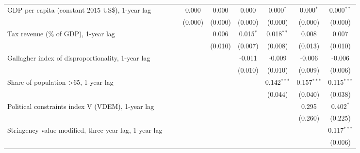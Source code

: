 \begin{table}[htbp]
\begin{tabular}{lcccccccc}
      GDP per capita (constant 2015 US\$), 1-year lag                     &              &              & 0.000        & 0.000   & 0.000        & 0.000$^{*}$   & 0.000$^{*}$   & 0.000$^{**}$\\   
                                                                          &              &              & (0.000)      & (0.000) & (0.000)      & (0.000)       & (0.000)       & (0.000)\\   
      Tax revenue (\% of GDP), 1-year lag                                 &              &              &              & 0.006   & 0.015$^{*}$  & 0.018$^{**}$  & 0.008         & 0.007\\   
                                                                          &              &              &              & (0.010) & (0.007)      & (0.008)       & (0.013)       & (0.010)\\   
      Gallagher index of disproportionality, 1-year lag                   &              &              &              &         & -0.011       & -0.009        & -0.006        & -0.006\\   
                                                                          &              &              &              &         & (0.010)      & (0.010)       & (0.009)       & (0.006)\\   
      Share of population >65, 1-year lag                                 &              &              &              &         &              & 0.142$^{***}$ & 0.157$^{***}$ & 0.115$^{***}$\\   
                                                                          &              &              &              &         &              & (0.044)       & (0.040)       & (0.038)\\   
      Political constraints index V (VDEM), 1-year lag                    &              &              &              &         &              &               & 0.295         & 0.402$^{*}$\\   
                                                                          &              &              &              &         &              &               & (0.260)       & (0.225)\\   
      Stringency value modified, three-year lag, 1-year lag               &              &              &              &         &              &               &               & 0.117$^{***}$\\   
                                                                          &              &              &              &         &              &               &               & (0.006)\\   

\end{tabular}
\end{table}
